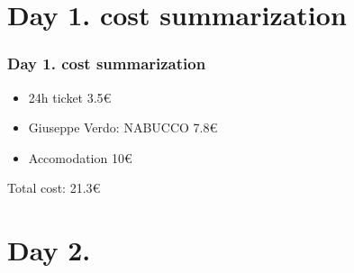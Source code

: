 \documentclass{beamer}
\begin{document}
	\section{Day 1. cost summarization}

	\begin{frame}
		\frametitle{Day 1. cost summarization}

		\begin{itemize}
			\item 24h ticket 3.5€
			\item Giuseppe Verdo: NABUCCO 7.8€
			\item Accomodation 10€
		\end{itemize}

		Total cost: 21.3€
	\end{frame}

	\section{Day 2.}
\end{document}
